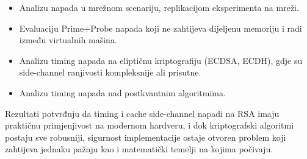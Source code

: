 \begin{itemize}
\item Analizu napada u mrežnom scenariju, replikacijom eksperimenta na mreži.
\item Evaluaciju Prime+Probe napada koji ne zahtijeva dijeljenu memoriju i radi između virtualnih mašina.
\item Analizu timing napada na eliptičnu kriptografiju (ECDSA, ECDH), gdje su side-channel ranjivosti kompleksnije ali prisutne.
\item Analizu timing napada nad postkvantnim algoritmima.
\end{itemize}

\noindent Rezultati potvrđuju da timing i cache side-channel napadi na RSA imaju praktičnu primjenjivost na modernom hardveru, i dok kriptografski algoritmi postaju sve robusniji, sigurnost implementacije ostaje otvoren problem koji zahtijeva jednaku pažnju kao i matematički temelji na kojima počivaju.
